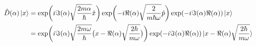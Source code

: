 \documentclass{article}
\begin{document}
        \begin{equation}
            \begin{split}    
                \hat{D}(\alpha)\ket{x} &= \exp\biggl(i\Im(\alpha)\sqrt{\frac{2m\alpha}{\hbar}}\hat{x}\biggr) \exp\biggl(-i\Re(\alpha)\sqrt{\frac{2}{m\hbar\omega}}\hat{p}\biggr) \exp(-i \Im(\alpha)\Re(\alpha)) \ket{x} \\
                    &= \exp\biggl(i\Im(\alpha)\sqrt{\frac{2m\omega}{\hbar}}\bigl(x-\Re(\alpha)\sqrt{\frac{2\hbar}{m\omega}}\bigr)\biggr) \exp(-i \Im(\alpha)\Re(\alpha)) \ket{x-\Re(\alpha)\sqrt{\frac{2\hbar}{m\omega}}} 
            \end{split}
        \end{equation}

        
        
\end{document}
